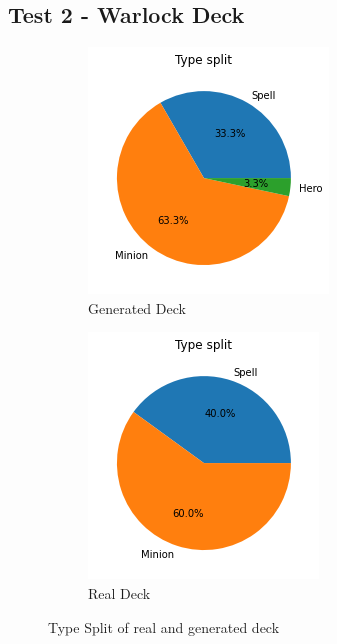 \documentclass{report} %
\begin{document}
\subsection{Test 2 - Warlock Deck}
\begin{figure}[H]
\centering
\begin{subfigure}{.5\textwidth}
  \centering
  \includegraphics[width=.75\linewidth]{TestImages/WarlockDeckSplitFake}
  \caption{Generated Deck}
\end{subfigure}%
\begin{subfigure}{.5\textwidth}
  \centering
  \includegraphics[width=.75\linewidth]{TestImages/WarlockDeckSplitReal}
  \caption{Real Deck}
\end{subfigure}
\caption{Type Split of real and generated deck}
\end{figure}
\end{document}
